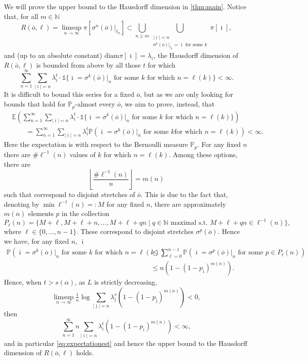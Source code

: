 \documentclass[12pt,]{article}
\theoremstyle{definition}
\theoremstyle{remark}
\renewcommand{\Bbb}[1]{\mathbb{#1}}
\newcommand{\bbE}{{\Bbb E}}
\newcommand{\bbN}{{\Bbb N}}         %
\newcommand{\bbP}{{\Bbb P}}
\newcommand{\0}{\mathbf{0}}
\newcommand{\diam}{\text{diam}}
\renewcommand{\le}{\leq}
\renewcommand{\ge}{\geq}
\newcommand{\bi}{{\overline {\imath}}}
\newcommand{\bj}{{\overline  {\jmath}}}
\newcommand{\bo}{{\overline o}}
\begin{document}
We will prove the upper bound to the Hausdorff dimension in \cref{thm:main}. Notice that, for all
$m\in \bbN$
\begin{equation}\label{eq:cover}
  R(\bo, \ell)=\limsup_{n\to\infty}\pi[\sigma^n(\bo)|_{\ell_n}]\subset \bigcup_{n\ge
  m}\bigcup_{\substack{|\bi|=n\\ \sigma^k(\bo)|_{\ell_k}=\bi\text{ for some $k$}}}\pi[\bi],
\end{equation}
and (up to an absolute constant) $\diam \pi[\bi]=\lambda_{\bi}$, the Hausdorff dimension of $R(\bo,
\ell)$ is bounded from above by all those $t$ for which
\[
  \sum_{n=1}^\infty \sum_{|\bi|=n}\lambda_{\bi}^t\cdot\mathbb 1\{\bi=\sigma^k(\bo)|_n \text{ for some $k$ for which }n=\ell(k)\}<\infty.
\]
It is difficult to bound this series for a fixed $\bo$, but as we are only looking for bounds that
hold for $\bbP_p$-almost every $\bo$, we aim to prove, instead, that
\begin{equation}\label{eq:expectationest}
  \begin{split}
&\bbE\left(\sum_{n=1}^\infty \sum_{|\bi|=n}\lambda_{\bi}^t\cdot\mathbb 1\{\bi=\sigma^k(\bo)|_n
\text{ for some $k$ for which }n=\ell(k)\}\right)\\
&\qquad=\sum_{n=1}^\infty \sum_{|\bi|=n}\lambda_\bi^t\bbP (\bi=\sigma^k(\bo)|_n \text{ for some $k$
for which }n=\ell(k))<\infty.
  \end{split}
\end{equation}
Here the expectation is with respect to the Bernoulli measure $\bbP_p$. For any fixed $n$ there are
$\#\ell^{-1}(n)$ values of $k$ for which $n=\ell(k)$. Among these options, there are
\[
  \left\lfloor\frac{\#\ell^{-1}(n)}{n}\right\rfloor=m(n)
\]
such that correspond to disjoint stretches of $\bo$. This is due to the fact that, denoting by
$\min\ell^{-1}(n)=:M$ for any fixed $n$, there are approximately $m(n)$ elements $p$ in the
collection
\[
  P_\ell(n)=\{M+\ell, M+\ell+n, \dots, M+\ell+qn\mid q\in \mathbb N\text{ maximal s.t. } M+\ell+qn\in \ell^{-1}(n)\},
\]
where $\ell\in\{0,\ldots,n-1\}$. These correspond to disjoint stretches $\sigma^p(\bo)$. Hence we
have, for any fixed $n$, $\bi$
\begin{align}
  \bbP (\bi=\sigma^k(\bo)|_n \text{ for some $k$ for which }n=\ell(k))
  &\le \sum_{\ell=0}^{n-1}\bbP(\bi=\sigma^p(\bo)|_n \text{ for some }p\in P_\ell(n))\nonumber\\
  &\le n\left(1-(1-p_{\bi})^{m(n)}\right).\label{eq:standard}
\end{align}
Hence, when $t> s(\alpha)$, as $L$ is strictly decreasing,
\[
  \limsup _{n\to \infty} \tfrac 1n \log \sum_{|\bj|=n}\lambda_{\bj}^{s}(1-(1-p_{\bj})^{m(n)})<0,
\]
then
\[
  \sum_{n=1}^\infty n\sum_{|\bi|=n}\lambda_\bi^t(1-(1-p_{\bi})^{m(n)})<\infty,
\]
and in particular \eqref{eq:expectationest} and hence the upper bound to the Hausdorff dimension of
$R(\bo, \ell)$ holds.
\end{document}
